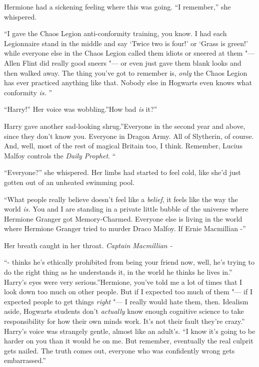 Hermione had a sickening feeling where this was going. ``I remember,''
she whispered.

``I gave the Chaos Legion anti-conformity training, you know. I had each
Legionnaire stand in the middle and say `Twice two is four!' or `Grass
is green!' while everyone else in the Chaos Legion called them idiots or
sneered at them "--- Allen Flint did really good sneers "--- or even just gave
them blank looks and then walked away. The thing you've got to remember
is, \emph{only} the Chaos Legion has ever practiced anything like that.
Nobody else in Hogwarts even knows what conformity \emph{is.} ''

``Harry!'' Her voice was wobbling.''How bad \emph{is} it?''

Harry gave another sad-looking shrug.''Everyone in the second year and
above, since they don't know you. Everyone in Dragon Army. All of
Slytherin, of course. And, well, most of the rest of magical Britain
too, I think. Remember, Lucius Malfoy controls the \emph{Daily Prophet}.
``

``Everyone?'' she whispered. Her limbs had started to feel cold, like
she'd just gotten out of an unheated swimming pool.

``What people really believe doesn't feel like a \emph{belief}, it feels
like the way the world \emph{is.} You and I are standing in a private
little bubble of the universe where Hermione Granger got Memory-Charmed.
Everyone else is living in the world where Hermione Granger tried to
murder Draco Malfoy. If Ernie Macmillian -''

Her breath caught in her throat. \emph{Captain Macmillian -}

``- thinks he's ethically prohibited from being your friend now, well,
he's trying to do the right thing as he understands it, in the world he
thinks he lives in.'' Harry's eyes were very serious.''Hermione, you've
told me a lot of times that I look down too much on other people. But if
I expected too much of them "--- if I expected people to get things
\emph{right} "--- I really would hate them, then. Idealism aside, Hogwarts
students don't \emph{actually} know enough cognitive science to take
responsibility for how their own minds work. It's not their fault
they're crazy.'' Harry's voice was strangely gentle, almost like an
adult's. ``I know it's going to be harder on you than it would be on me.
But remember, eventually the real culprit gets nailed. The truth comes
out, everyone who was confidently wrong gets embarrassed.''


